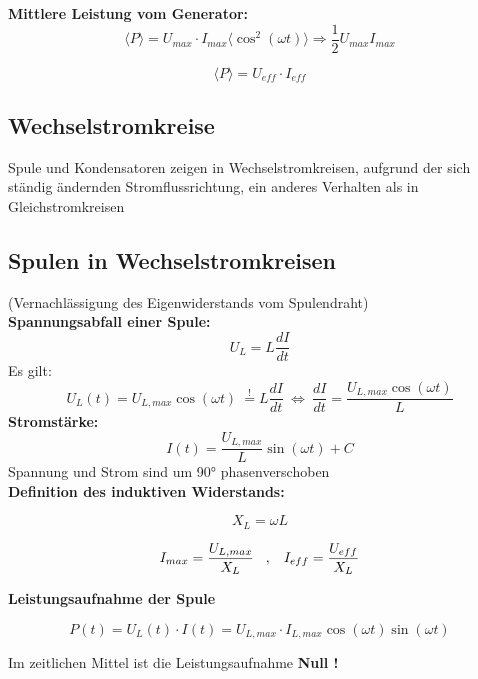 \textbf{Mittlere Leistung vom Generator:}
\[
    \langle P \rangle = U_{max} \cdot I_{max} \langle \cos^2{(\omega t)} \rangle \Rightarrow \frac{1}{2} U_{max} I_{max}
\]
\begin{formulabox}
    \[
        \langle P \rangle = U_{eff} \cdot I_{eff}
    \]
\end{formulabox}

\subsection{Wechselstromkreise}
Spule und Kondensatoren zeigen in Wechselstromkreisen, aufgrund der sich ständig ändernden Stromflussrichtung, ein anderes Verhalten als in Gleichstromkreisen

\subsection{Spulen in Wechselstromkreisen}
(Vernachlässigung des Eigenwiderstands vom Spulendraht) \\[1ex]
\textbf{Spannungsabfall einer Spule:}
\[
    U_L = L \frac{dI}{dt}
\]
\hspace{5mm} Es gilt:
\[
    U_L(t) = U_{L,max} \cos{( \omega t)} \ \stackrel{!}{=} L \frac{dI}{dt} \ \iff \ \frac{dI}{dt} = \frac{U_{L,max} \cos{( \omega t)}}{L}
\]
\hspace{5mm} \textbf{Stromstärke:}
\[
    I(t) = \frac{U_{L,max}}{L} \sin{(\omega t)} + C
\]
Spannung und Strom sind um 90° phasenverschoben \\[1ex]

\textbf{Definition des induktiven Widerstands:}
\begin{formulabox}
    \[
    X_L = \omega L
    \]
\end{formulabox}
\[
    I_{max} = \frac{U_{L,max}}{X_L} \hspace{3mm} , \hspace{3mm} I_{eff} = \frac{U_{eff}}{X_L}
\]

\textbf{Leistungsaufnahme der Spule}
\begin{formulabox}
    \[
        P(t) = U_L(t) \cdot I(t) = U_{L,max} \cdot I_{L,max} \cos{(\omega t)}\sin{(\omega t)}
    \]
\end{formulabox}
Im zeitlichen Mittel ist die Leistungsaufnahme \textbf{Null !}

